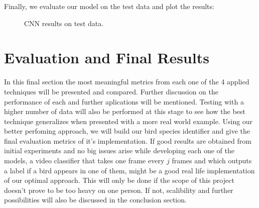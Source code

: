 \documentclass[11pt]{article}
\begin{document}
\begin{singlespace}
Finally, we evaluate our model on the test data and plot the results: \\

\begin{figure}[h]
    \centering
    
    \caption{CNN results on test data.}
\end{figure}



\section{Evaluation and Final Results}

In this final section the most meaningful metrics from each one of the 4 applied techniques will be presented and compared. Further discussion on the performance of each and further aplications will be mentioned. Testing with a higher number of data will also be performed at this stage to see how the best technique generalizes when presented with a more real world example. Using our better perfoming approach, we will build our bird species identifier and give the final evaluation metrics of it's implementation. If good results are obtained from initial experiments and no big issues arise while developing each one of the models, a video classifier that takes one frame every $j$ frames and which outputs a label if a bird appears in one of them, might be a good real life implementation of our optimal approach. This will only be done if the scope of this project doesn't prove to be too heavy on one person. If not, scalibility and further possibilities will also be discussed in the conclusion section. 



\end{singlespace}
\end{document}
